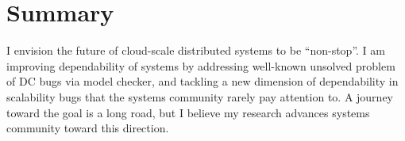 \documentclass[11pt]{article}
\begin{document}
\section{Summary}

I envision the future of cloud-scale distributed systems to be ``non-stop''. I
am improving dependability of systems by addressing well-known unsolved problem
of DC bugs via model checker, and tackling a new dimension of dependability in
scalability bugs that the systems community rarely pay attention to. A journey
toward the goal is a long road, but I believe my research advances systems
community toward this direction. 


\end{document}
